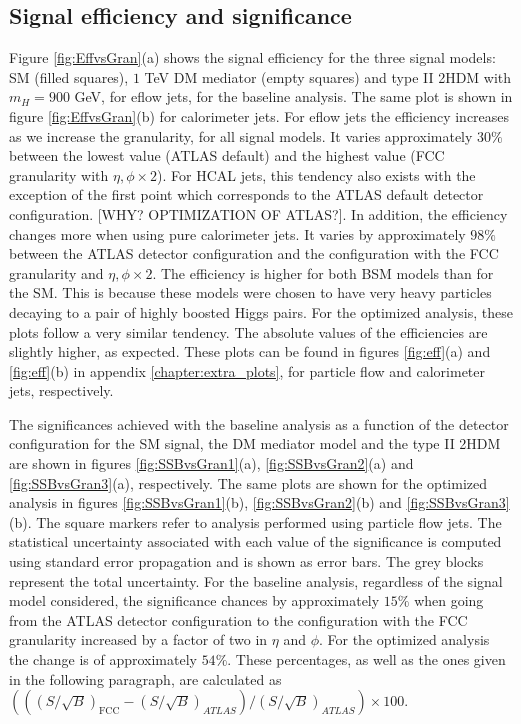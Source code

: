 \subsection{Signal efficiency and significance}
\label{sec:granstudies}

Figure \ref{fig:EffvsGran}(a) shows the signal efficiency for the three signal models: SM (filled squares), $1$ TeV DM mediator (empty squares) and type II 2HDM with $m_H=900$ GeV, for eflow jets, for the baseline analysis. The same plot is shown in figure \ref{fig:EffvsGran}(b) for calorimeter jets. 
For eflow jets the efficiency increases as we increase the granularity, for all signal models. It varies approximately $30\%$ between the lowest value (ATLAS default) and the highest value (FCC granularity with $\eta,\phi\times 2$). For HCAL jets, this tendency also exists with the exception of the first point which corresponds to the ATLAS default detector configuration. [WHY? OPTIMIZATION OF ATLAS?]. In addition, the efficiency changes more when using pure calorimeter jets. It varies by approximately $98\%$ between the ATLAS detector configuration and the configuration with the FCC granularity and $\eta,\phi\times 2$.
The efficiency is higher for both BSM models than for the SM. This is because these models were chosen to have very heavy particles decaying to a pair of highly boosted Higgs pairs. For the optimized analysis, these plots follow a very similar tendency. The absolute values of the efficiencies are slightly higher, as expected. These plots can be found in figures \ref{fig:eff}(a) and \ref{fig:eff}(b) in appendix \ref{chapter:extra_plots}, for particle flow and calorimeter jets, respectively.

The significances achieved with the baseline analysis as a function of the detector configuration for the SM signal, the DM mediator model and the type II 2HDM are shown in figures \ref{fig:SSBvsGran1}(a), \ref{fig:SSBvsGran2}(a) and \ref{fig:SSBvsGran3}(a), respectively. The same plots are shown for the optimized analysis in figures \ref{fig:SSBvsGran1}(b), \ref{fig:SSBvsGran2}(b) and \ref{fig:SSBvsGran3}(b). The square markers refer to analysis performed using particle flow jets. The statistical uncertainty associated with each value of the significance is computed using standard error propagation and is shown as error bars. The grey blocks represent the total uncertainty.
For the baseline analysis, regardless of the signal model considered, the significance chances by approximately $15\%$ when going from the ATLAS detector configuration to the configuration with the FCC granularity increased by a factor of two in $\eta$ and $\phi$. For the optimized analysis the change is of approximately $54\%$. These percentages, as well as the ones given in the following paragraph, are calculated as $\left(((S/\sqrt{B})_{\text{FCC}}-(S/\sqrt{B})_{ATLAS})/(S/\sqrt{B})_{ATLAS}\right)\times 100$.


